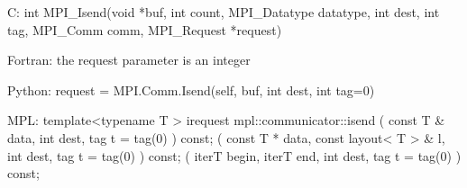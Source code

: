 C:
int MPI_Isend(void *buf,
  int count, MPI_Datatype datatype, int dest, int tag,
  MPI_Comm comm, MPI_Request *request)

Fortran:
the request parameter is an integer
  
Python:
request = MPI.Comm.Isend(self, buf, int dest, int tag=0)

MPL:
template<typename T >
irequest mpl::communicator::isend
   ( const T & data, int dest, tag t = tag(0) ) const;
   ( const T * data, const layout< T > &  l, int  dest, tag  t = tag(0) ) const;
   ( iterT  begin, iterT  end, int  dest, tag  t = tag(0) ) const;

